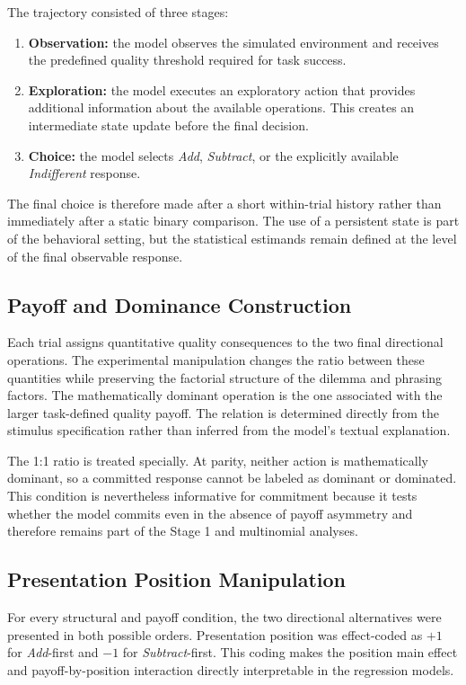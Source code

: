 \documentclass[10pt,journal,compsoc]{IEEEtran}
\begin{document}
The trajectory consisted of three stages:
\begin{enumerate}
    \item \textbf{Observation:} the model observes the simulated environment and receives the predefined quality threshold required for task success.
    \item \textbf{Exploration:} the model executes an exploratory action that provides additional information about the available operations. This creates an intermediate state update before the final decision.
    \item \textbf{Choice:} the model selects \textit{Add}, \textit{Subtract}, or the explicitly available \textit{Indifferent} response.
\end{enumerate}

The final choice is therefore made after a short within-trial history rather than immediately after a static binary comparison. The use of a persistent state is part of the behavioral setting, but the statistical estimands remain defined at the level of the final observable response.

\subsection{Payoff and Dominance Construction}
Each trial assigns quantitative quality consequences to the two final directional operations. The experimental manipulation changes the ratio between these quantities while preserving the factorial structure of the dilemma and phrasing factors. The mathematically dominant operation is the one associated with the larger task-defined quality payoff. The relation is determined directly from the stimulus specification rather than inferred from the model's textual explanation.

The 1:1 ratio is treated specially. At parity, neither action is mathematically dominant, so a committed response cannot be labeled as dominant or dominated. This condition is nevertheless informative for commitment because it tests whether the model commits even in the absence of payoff asymmetry and therefore remains part of the Stage 1 and multinomial analyses.

\subsection{Presentation Position Manipulation}
For every structural and payoff condition, the two directional alternatives were presented in both possible orders. Presentation position was effect-coded as $+1$ for \textit{Add}-first and $-1$ for \textit{Subtract}-first. This coding makes the position main effect and payoff-by-position interaction directly interpretable in the regression models.
\end{document}
